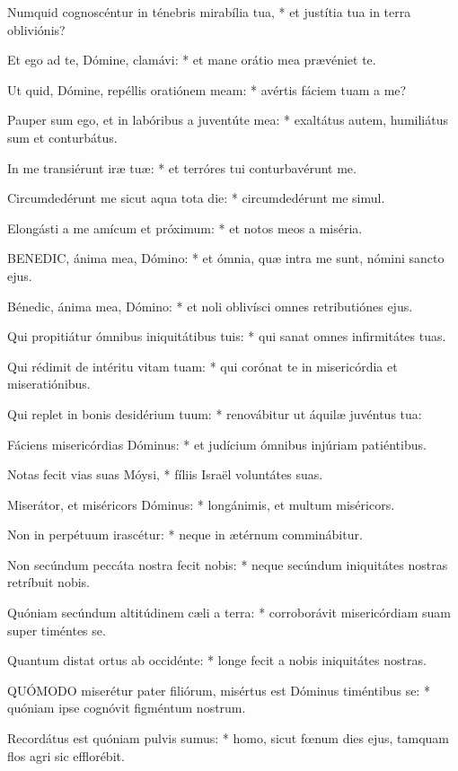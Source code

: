 Numquid cognoscéntur in ténebris mirabília tua, * et justítia tua in terra obliviónis?

Et ego ad te, Dómine, clamávi: * et mane orátio mea prævéniet te.

Ut quid, Dómine, repéllis oratiónem meam: * avértis fáciem tuam a me?

Pauper sum ego, et in labóribus a juventúte mea: * exaltátus autem, humiliátus sum et conturbátus.

In me transiérunt iræ tuæ: * et terróres tui conturbavérunt me.

Circumdedérunt me sicut aqua tota die: * circumdedérunt me simul.

Elongásti a me amícum et próximum: * et notos meos a miséria.


\lettrine[lines=2]{B}{ENEDIC}, ánima mea, Dómino: * et ómnia, quæ intra me sunt, nómini sancto ejus.

Bénedic, ánima mea, Dómino: * et noli oblivísci omnes retributiónes ejus.

Qui propitiátur ómnibus iniquitátibus tuis: * qui sanat omnes infirmitátes tuas.

Qui rédimit de intéritu vitam tuam: * qui corónat te in misericórdia et miseratiónibus.

Qui replet in bonis desidérium tuum: * renovábitur ut áquilæ juvéntus tua:

Fáciens misericórdias Dóminus: * et judícium ómnibus injúriam patiéntibus.

Notas fecit vias suas Móysi, * fíliis Israël voluntátes suas.

Miserátor, et miséricors Dóminus: * longánimis, et multum miséricors.

Non in perpétuum irascétur: * neque in ætérnum comminábitur.

Non secúndum peccáta nostra fecit nobis: * neque secúndum iniquitátes nostras retríbuit nobis.

Quóniam secúndum altitúdinem cæli a terra: * corroborávit misericórdiam suam super timéntes se.

Quantum distat ortus ab occidénte: * longe fecit a nobis iniquitátes nostras.


\lettrine[lines=2]{Q}{UÓMODO} miserétur pater filiórum, misértus est Dóminus timéntibus se: * quóniam ipse cognóvit figméntum nostrum.

Recordátus est quóniam pulvis sumus: * homo, sicut fœnum dies ejus, tamquam flos agri sic efflorébit.


